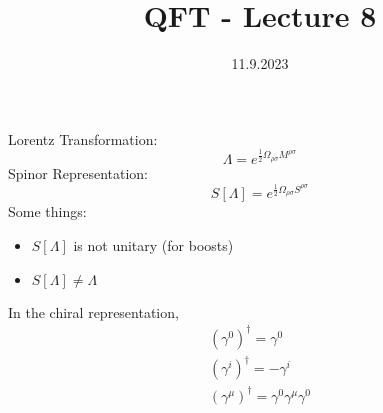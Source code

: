 \documentclass[]{scrartcl}
\title{QFT - Lecture 8}
\author{}
\date{11.9.2023}
\begin{document}
\maketitle
\newpage
\tableofcontents
\newpage

Lorentz Transformation: $$
\Lambda = e^{\frac{1}{2}\Omega_{\rho\sigma}M^{\rho\sigma}}
$$
Spinor Representation: $$
S[\Lambda] = e^{\frac{1}{2}\Omega_{\rho\sigma}S^{\rho\sigma}}
$$
Some things:
\begin{itemize}
	\item $S[\Lambda]$ is not unitary (for boosts)
	\item $S[\Lambda] \neq \Lambda$
\end{itemize}
In the chiral representation,
\begin{gather}
	(\gamma^0)^\dagger = \gamma^0\\
	(\gamma^i)^\dagger = -\gamma^i\\
	(\gamma^\mu)^\dagger = \gamma^0\gamma^\mu\gamma^0
\end{gather}
\end{document}
